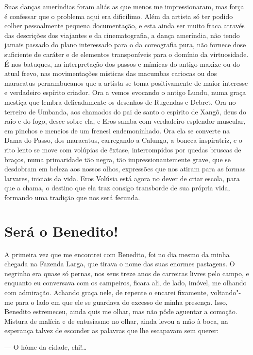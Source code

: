 Suas danças ameríndias foram aliás as que menos me impressionaram, mas
força é confessar que o problema aqui era dificílimo. Além da artista só
ter podido colher pessoalmente pequena documentação, e esta ainda ser
muito fraca através das descrições dos viajantes e da cinematografia, a
dança ameríndia, não tendo jamais passado do plano interessado para o da
coreografia pura, não fornece dose suficiente de caráter e de elementos
transponíveis para o domínio da virtuosidade. É nos batuques, na
interpretação dos passos e mímicas do antigo maxixe ou do atual frevo,
nas movimentações místicas das macumbas cariocas ou dos maracatus
pernambucanos que a artista se toma positivamente de maior interesse e
verdadeiro espírito criador. Ora a vemos evocando o antigo Lundu, numa
graça mestiça que lembra delicadamente os desenhos de Rugendas e Debret.
Ora no terreiro de Umbanda, aos chamados do pai de santo o espírito de
Xangô, deus do raio e do fogo, desce sobre ela, e Eros samba com
verdadeiro esplendor muscular, em pinchos e meneios de um frenesi
endemoninhado. Ora ela se converte na Dama do Passo, dos maracatus,
carregando a Calunga, a boneca inspiratriz, e o rito lento se move com
volúpias de êxtase, interrompidos por quedas bruscas de braços, numa
primaridade tão negra, tão impressionantemente grave, que se desdobram
em beleza aos nossos olhos, expressões que nos atiram para as formas
larvares, iniciais da vida. Eros Volúsia está agora no dever de criar
escola, para que a chama, o destino que ela traz consigo transborde de
sua própria vida, formando uma tradição que nos será fecunda.

\chapter{Será o Benedito!}

A primeira vez que me encontrei com Benedito, foi no dia mesmo da minha
chegada na Fazenda Larga, que tirava o nome das suas enormes pastagens.
O negrinho era quase só pernas, nos seus treze anos de carreiras livres
pelo campo, e enquanto eu conversava com os campeiros, ficara ali, de
lado, imóvel, me olhando com admiração. Achando graça nele, de repente o
encarei fixamente, voltando"-me para o lado em que ele se guardava do
excesso de minha presença. Isso, Benedito estremeceu, ainda quis me
olhar, mas não pôde aguentar a comoção. Mistura de malícia e de
entusiasmo no olhar, ainda levou a mão à boca, na esperança talvez de
esconder as palavras que lhe escapavam sem querer:

--- O hôme da cidade, chi!\ldots{}

